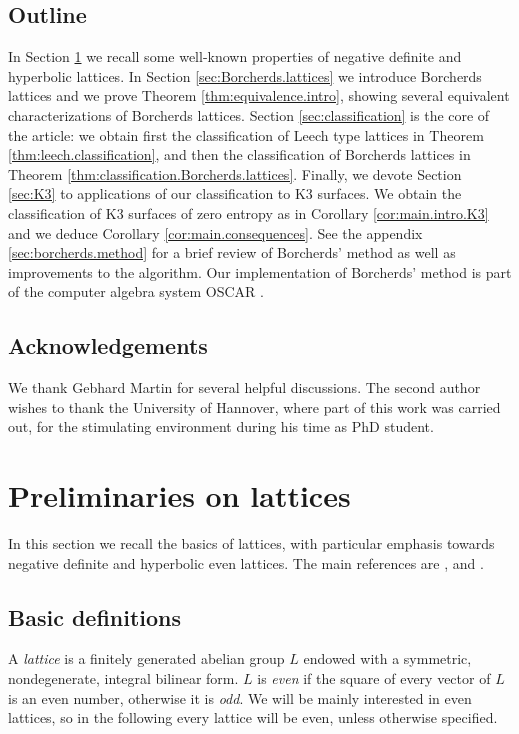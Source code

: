 \documentclass[11pt,letterpaper]{amsart}
\begin{document}
\subsection{Outline}
In Section \ref{sec:lattices} we recall some well-known properties of negative definite and hyperbolic lattices. In Section \ref{sec:Borcherds.lattices} we introduce Borcherds lattices and we prove Theorem \ref{thm:equivalence.intro}, showing several equivalent characterizations of Borcherds lattices. 
Section \ref{sec:classification} is the core of the article: we obtain first the classification of Leech type lattices in Theorem \ref{thm:leech.classification}, and then the classification of Borcherds lattices in Theorem \ref{thm:classification.Borcherds.lattices}. Finally, we devote Section \ref{sec:K3} to applications of our classification to K3 surfaces. We obtain the classification of K3 surfaces of zero entropy as in Corollary \ref{cor:main.intro.K3} and we deduce Corollary \ref{cor:main.consequences}.
See the appendix \ref{sec:borcherds.method} for a brief review of Borcherds' method as well as improvements to the algorithm.
Our implementation of Borcherds' method is part of the computer algebra system OSCAR \cite{OSCAR}. 

\subsection*{Acknowledgements}
We thank Gebhard Martin for several helpful discussions. The second author wishes to thank the University of Hannover, where part of this work was carried out, for the stimulating environment during his time as PhD student.


\section{Preliminaries on lattices} \label{sec:lattices}

In this section we recall the basics of lattices, with particular emphasis towards negative definite and hyperbolic even lattices. The main references are \cite{nikulin.integral.symmetric.bilinear}, \cite{conway.sloane.lattices} and \cite{ebeling.lattices}.

\subsection{Basic definitions} 

A \emph{lattice} is a finitely generated abelian group $L$ endowed with a symmetric, nondegenerate, integral bilinear form. 
$L$ is \emph{even} if the square of every vector of $L$ is an even number, otherwise it is \emph{odd}. We will be mainly interested in even lattices, so in the following every lattice will be even, unless otherwise specified.
\end{document}
